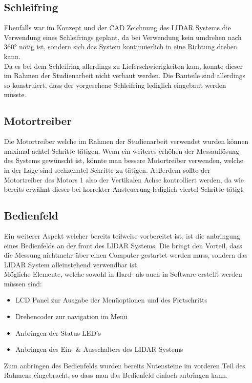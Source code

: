 \subsection{Schleifring}
Ebenfalls war im Konzept und der \ac{CAD} Zeichnung des \ac{LIDAR} Systems die Verwendung eines Schleifrings geplant, da bei Verwendung kein umdrehen nach 360° nötig ist, sondern sich das System kontinuierlich in eine Richtung drehen kann.\\
Da es bei dem Schleifring allerdings zu Lieferschwierigkeiten kam, konnte dieser im Rahmen der Studienarbeit nicht verbaut werden. Die Bauteile sind allerdings so konstruiert, dass der vorgesehene Schleifring lediglich eingebaut werden müsste. 
\subsection{Motortreiber}
Die Motortreiber welche im Rahmen der Studienarbeit verwendet wurden können maximal achtel Schritte tätigen. Wenn ein weiteres erhöhen der Messauflösung des Systems gewünscht ist, könnte man bessere Motortreiber verwenden, welche in der Lage sind sechzehntel Schritte zu tätigen. Außerdem sollte der Motortreiber des Motors 1 also der Vertikalen Achse kontrolliert werden, da wie bereits erwähnt dieser bei korrekter Ansteuerung lediglich viertel Schritte tätigt. 
\subsection{Bedienfeld}
Ein weiterer Aspekt welcher bereits teilweise vorbereitet ist, ist die anbringung eines Bedienfelds an der front des \ac{LIDAR} Systems. Die bringt den Vorteil, dass die Messung nichtmehr über einen Computer gestartet werden muss, sondern das \ac{LIDAR} System alleinstehend verwendbar ist.\\
Mögliche Elemente, welche sowohl in Hard- als auch in Software erstellt werden müssen sind:
\begin{itemize}
	\item LCD Panel zur Ausgabe der Menüoptionen und des Fortschritts
	\item Drehencoder zur navigation im Menü
	\item Anbringen der Status LED's
	\item Anbringen des Ein- \& Ausschalters des \ac{LIDAR} Systems
\end{itemize}
Zum anbringen des Bedienfelds wurden bereits Nutensteine im vorderen Teil des Rahmens eingebracht, so dass man das Bedienfeld einfach anbringen kann.

